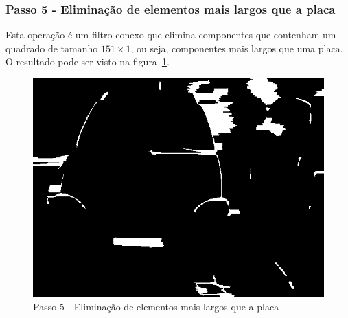 \documentclass[11pt]{article} %
\begin{document}
\subsubsection{Passo 5 - Eliminação de elementos mais largos que a placa}
	Esta operação é um filtro conexo que elimina componentes que contenham um quadrado de tamanho $151\times1$, ou seja, componentes mais largos que uma placa. O resultado pode ser visto na figura~\ref{step4}.
	\begin{figure}[!h]
		\begin{center}
		\includegraphics[scale=0.5]{img_relatorio/step4.png}
		\caption{Passo 5 - Eliminação de elementos mais largos que a placa}\label{step4}
		\end{center}
	\end{figure}
\newpage
\end{document}

